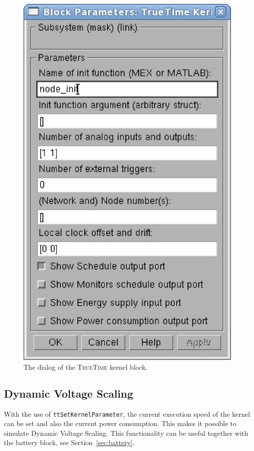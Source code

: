 \documentclass[final,twoside]{rapport}
\begin{document}
\begin{figure}[tbp]
  \centerline{\includegraphics[scale=0.3]{kdialog.eps}}
  \caption{The dialog of the \textsc{TrueTime} kernel block.}
  \label{fig:kdialog}
\end{figure}

\subsection{Dynamic Voltage Scaling}
With the use of {\tt ttSetKernelParameter}, the current execution speed of the
kernel can be set and also the current power consumption. This makes it
possible to simulate Dynamic Voltage Scaling. This functionality can
be useful together with the battery block, see Section~\ref{sec:battery}.
\end{document}
